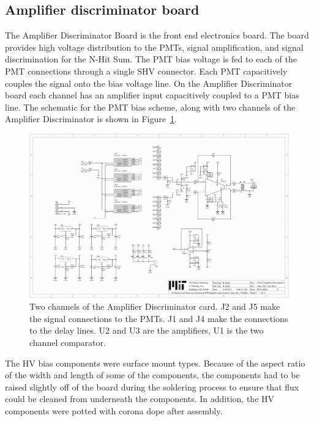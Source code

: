 \documentclass{JINST}
\begin{document}
\subsection{Amplifier discriminator board}
\label{sec:Amp-Disc}
%
The Amplifier Discriminator Board is the front end electronics board.
The board provides high voltage distribution to the PMTs, signal
amplification, and signal discrimination for the N-Hit Sum.  The PMT
bias voltage is fed to each of the PMT connections through a single
SHV connector.  Each PMT capacitively couples the signal onto the bias
voltage line.  On the Amplifier Discriminator board each channel has
an amplifier input capacitively coupled to a PMT bias line.  The schematic for the
PMT bias scheme, along with two channels of the Amplifier Discriminator is shown in Figure~\ref{fig:ampdiscsch}.

\begin{figure}[ht]
\begin{center}
\includegraphics[width=5.5in, keepaspectratio=true, page=2, trim=4.54in 2.12in 4.54in 2.12in, clip=true]{graphics/veto_sch.pdf}
\caption{Two channels of the Amplifier Discriminator card.  J2 and J5 make the signal connections to the PMTs.  J1 and J4 make the connections to the delay lines.  U2 and U3 are the amplifiers, U1 is the two channel comparator.
\label{fig:ampdiscsch}}
\end{center}
\end{figure}

The HV bias components were surface mount types.  Because of the
aspect ratio of the width and length of some of the components, the
components had to be raised slightly off of the board during the
soldering process to ensure that flux could be cleaned from underneath
the components.  In addition, the HV components were potted with
corona dope after assembly.
\end{document}
